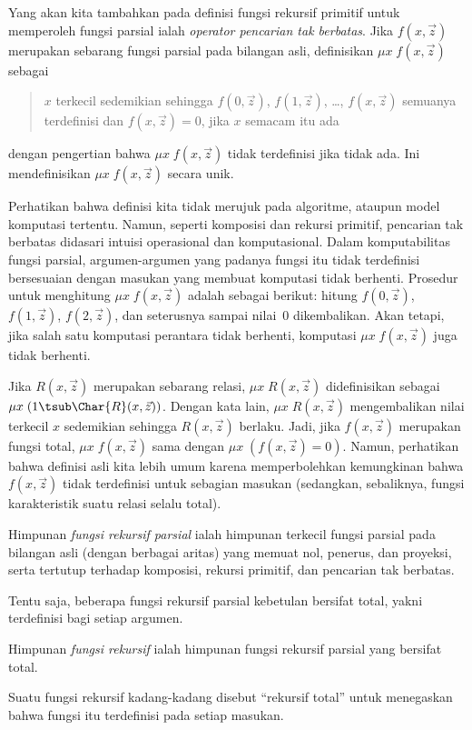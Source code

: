 \documentclass[../../../include/open-logic-section]{subfiles}
\begin{document}
Yang akan kita tambahkan pada definisi fungsi rekursif primitif untuk
memperoleh fungsi parsial ialah \emph{operator pencarian tak berbatas}. Jika
$f(x,\vec z)$ merupakan sebarang fungsi parsial pada bilangan asli, definisikan
$\mu x\;f(x,\vec z)$ sebagai
\begin{quote}
  $x$ terkecil sedemikian sehingga $f(0,\vec z)$, $f(1,\vec z)$, \dots,
  $f(x,\vec z)$ semuanya terdefinisi dan $f(x,\vec z)=0$, jika $x$ semacam itu
  ada
\end{quote}
dengan pengertian bahwa $\mu x\;f(x,\vec z)$ tidak terdefinisi jika tidak ada.
Ini mendefinisikan $\mu x\;f(x,\vec z)$ secara unik.

\begin{explain}
Perhatikan bahwa definisi kita tidak merujuk pada algoritme, ataupun model komputasi tertentu. Namun, seperti
komposisi dan rekursi primitif, pencarian tak berbatas didasari intuisi
operasional dan komputasional. Dalam komputabilitas fungsi parsial,
argumen-argumen yang padanya fungsi itu tidak terdefinisi bersesuaian dengan
masukan yang membuat
komputasi tidak berhenti. Prosedur untuk menghitung $\mu x\;f(x,\vec z)$
adalah sebagai berikut: hitung $f(0,\vec z)$, $f(1,\vec z)$,
$f(2,\vec z)$, dan seterusnya sampai nilai~$0$ dikembalikan. Akan tetapi,
jika salah satu komputasi perantara tidak berhenti, komputasi
$\mu x\;f(x,\vec z)$ juga tidak berhenti.
\end{explain}

Jika $R(x,\vec z)$ merupakan sebarang relasi, $\mu x\;R(x,\vec z)$
didefinisikan sebagai $\mu x\;(1\tsub\Char{R}(x,\vec z))$. Dengan kata lain,
$\mu x\;R(x,\vec z)$ mengembalikan nilai terkecil $x$ sedemikian sehingga
$R(x,\vec z)$ berlaku. Jadi, jika $f(x,\vec z)$ merupakan fungsi total,
$\mu x\;f(x,\vec z)$ sama dengan $\mu x\;(f(x,\vec z)=0)$. Namun,
perhatikan bahwa definisi asli kita lebih umum karena memperbolehkan
kemungkinan bahwa $f(x,\vec z)$ tidak terdefinisi untuk sebagian masukan (sedangkan,
sebaliknya, fungsi karakteristik suatu relasi selalu total).

\begin{defn}
Himpunan \emph{fungsi rekursif parsial} ialah himpunan terkecil fungsi parsial
pada bilangan asli (dengan berbagai aritas) yang memuat nol, penerus, dan
proyeksi, serta tertutup terhadap komposisi, rekursi primitif, dan pencarian
tak berbatas.
\end{defn}

Tentu saja, beberapa fungsi rekursif parsial kebetulan bersifat total, yakni
terdefinisi bagi setiap argumen.

\begin{defn}
Himpunan \emph{fungsi rekursif} ialah himpunan fungsi rekursif parsial yang
bersifat total.
\end{defn}

Suatu fungsi rekursif kadang-kadang disebut ``rekursif total'' untuk
menegaskan bahwa fungsi itu terdefinisi pada setiap masukan.
\end{document}
